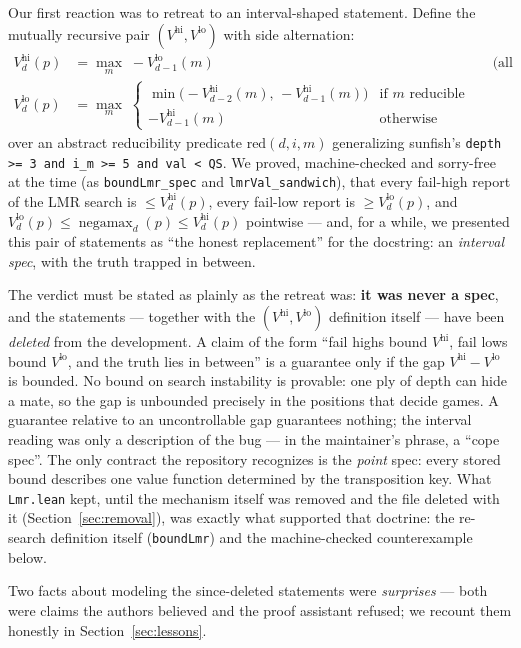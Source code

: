 \documentclass[11pt]{article}
\DeclareMathOperator{\negamax}{negamax}
\newcommand{\Vhi}{V^{\mathrm{hi}}}
\newcommand{\Vlo}{V^{\mathrm{lo}}}
\theoremstyle{plain}
\theoremstyle{definition}
\theoremstyle{remark}
\begin{document}
Our first reaction was to retreat to an interval-shaped statement.
Define the mutually recursive pair $(\Vhi, \Vlo)$ with side
alternation:
\begin{align*}
  \Vhi_d(p) &= \max_{m}\; -\Vlo_{d-1}(m)
    && \text{(all full depth)}\\
  \Vlo_d(p) &= \max_{m}\;
    \begin{cases}
      \min\bigl(-\Vhi_{d-2}(m),\, -\Vhi_{d-1}(m)\bigr)
        & \text{if $m$ reducible}\\
      -\Vhi_{d-1}(m) & \text{otherwise}
    \end{cases}
\end{align*}
over an abstract reducibility predicate
$\mathrm{red}(d, i, m)$ generalizing sunfish's
\texttt{depth >= 3 and i\_m >= 5 and val < QS}.  We proved,
machine-checked and sorry-free at the time (as \texttt{boundLmr\_spec}
and \texttt{lmrVal\_sandwich}), that every fail-high report of the LMR
search is $\le \Vhi_d(p)$, every fail-low report is $\ge \Vlo_d(p)$,
and $\Vlo_d(p) \le \negamax_d(p) \le \Vhi_d(p)$ pointwise --- and, for
a while, we presented this pair of statements as ``the honest
replacement'' for the docstring: an \emph{interval spec}, with the
truth trapped in between.

The verdict must be stated as plainly as the retreat was: \textbf{it
was never a spec}, and the statements --- together with the
$(\Vhi,\Vlo)$ definition itself --- have been \emph{deleted} from the
development.  A claim of the form ``fail highs bound $\Vhi$, fail lows
bound $\Vlo$, and the truth lies in between'' is a guarantee only if
the gap $\Vhi - \Vlo$ is bounded.  No bound on search instability is
provable: one ply of depth can hide a mate, so the gap is unbounded
precisely in the positions that decide games.  A guarantee relative to
an uncontrollable gap guarantees nothing; the interval reading was only
a description of the bug --- in the maintainer's phrase, a ``cope
spec''.  The only contract the repository recognizes is the
\emph{point} spec: every stored bound describes one value function
determined by the transposition key.  What \texttt{Lmr.lean} kept,
until the mechanism itself was removed and the file deleted with it
(Section~\ref{sec:removal}), was exactly what supported that doctrine:
the re-search definition itself (\texttt{boundLmr}) and the
machine-checked counterexample below.

Two facts about modeling the since-deleted statements were
\emph{surprises} --- both were claims the authors believed and the
proof assistant refused; we recount them honestly in
Section~\ref{sec:lessons}.
\end{document}

